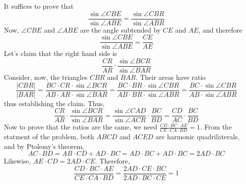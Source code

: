 \documentclass[11pt,a4paper]{article}
\begin{document}
\begin{enumerate}
	It suffices to prove that 
	\[\frac{\sin\angle CBE}{\sin\angle ABE}=\frac{\sin\angle CBR}{\sin\angle ABR}\]
	Now, $\angle CBE$ and $\angle ABE$ are the angle subtended by $CE$ and $AE$, and therefore 
	\[
	\frac{\sin\angle CBE}{\sin\angle ABE} = \frac{CE}{AE}
	\]
	Let's claim that the right hand side is 
	\[\frac{CR}{AR}\cdot\frac{\sin\angle BCR}{\sin\angle BAR}\]
	Consider, now, the triangles $CBR$ and $BAR$. Their areas have ratio 
	\[
	\frac{|CBR|}{|BAR|}=\frac{BC\cdot CR\cdot \sin\angle BCR}{AB\cdot AR\cdot \sin\angle BAR} 
	= \frac{BC \cdot BR\cdot \sin\angle CBR}{AB\cdot BR\cdot\sin\angle ABR} 
	= \frac{BC \cdot \sin\angle CBR}{AB\cdot\sin\angle ABR} 
	\]
	thus establishing the claim. 
	Thus, 
	\[\frac{CR}{AR}\cdot\frac{\sin\angle BCR}{\sin\angle BAR}=\frac{\sin\angle CAD}{\sin\angle ACR}\cdot\frac{BC}{BD}=\frac{CD}{AC}\cdot\frac{BC}{BD}\]
	Now to prove that the ratios are the same, we need 
	$\frac{CD\cdot BC\cdot AE}{CE\cdot CA\cdot BD}=1$.  
	From the statment of the problem, both $ABCD$ and $ACED$ are harmonic quadrilaterals, 
	and by Ptolemy's theorem, 
	\[AC\cdot BD=AB\cdot CD+AD\cdot BC=AD\cdot BC+AD\cdot BC=2AD\cdot BC\]  
	Likewise, $AE\cdot CD=2AD\cdot CE.$ Therefore, 
	\[\frac{CD\cdot BC\cdot AE}{CE\cdot CA\cdot BD}=\frac{2AD\cdot CE\cdot BC}{2AD\cdot BC\cdot CE}=1\]
\end{enumerate}
\end{document}
